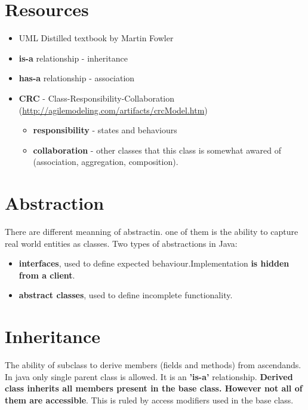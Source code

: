 \documentclass{report}
\begin{document}
\chapter{Resources}

\begin{itemize}
	\item UML Distilled textbook by Martin Fowler 
	\item \textbf{is-a} relationship - inheritance
	\item \textbf{has-a} relationship - association
	\item \textbf{CRC} - Class-Responsibility-Collaboration (\url{http://agilemodeling.com/artifacts/crcModel.htm})
	\begin{itemize}
		\item \textbf{responsibility} - states and behaviours
		\item \textbf{collaboration} - other classes that this class is somewhat awared of (association, aggregation,
		composition).
	\end{itemize}
\end{itemize}

\chapter{Abstraction}
There are different meanning of abstractin. one of them is the ability to capture real world entities as classes.
Two types of abstractions in Java:
\begin{itemize}
	\item \textbf{interfaces}, used to define expected behaviour.Implementation \textbf{is hidden from a client}.
	\item \textbf{abstract classes}, used to define incomplete functionality.
\end{itemize}

\chapter{Inheritance}
The ability of subclass to derive members (fields and methods) from ascendands. In java only single parent class is allowed. It is an \textbf{'is-a'} relationship.
\textbf{Derived class inherits all members present in the base class. However not all of them are accessible}. This is ruled by access modifiers used in the base class.
\end{document}
